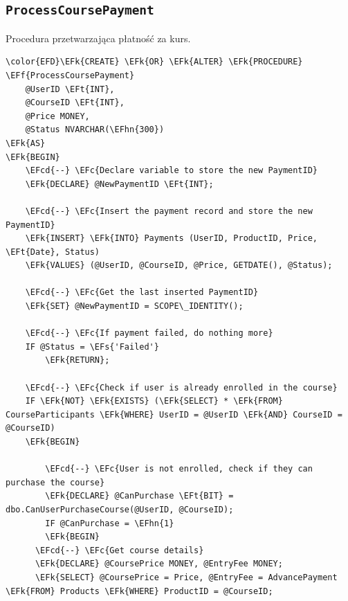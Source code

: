 \documentclass[11pt]{article}
\newcommand{\EFc}[1]{\textcolor{EFc}{\textit{#1}}} %
\newcommand{\EFcd}[1]{\textcolor{EFcd}{\textit{#1}}} %
\newcommand{\EFs}[1]{\textcolor{EFs}{#1}} %
\newcommand{\EFk}[1]{\textcolor{EFk}{\textbf{#1}}} %
\newcommand{\EFf}[1]{\textcolor{EFf}{#1}} %
\newcommand{\EFt}[1]{\textcolor{EFt}{\textbf{#1}}} %
\newcommand{\EFhn}[1]{\textcolor{EFhn}{#1}} %
\begin{document}
\subsection{\texttt{ProcessCoursePayment}}
\label{sec:org6cb37be}
Procedura przetwarzająca płatność za kurs.
\begin{Code}
\begin{Verbatim}
\color{EFD}\EFk{CREATE} \EFk{OR} \EFk{ALTER} \EFk{PROCEDURE} \EFf{ProcessCoursePayment}
    @UserID \EFt{INT},
    @CourseID \EFt{INT},
    @Price MONEY,
    @Status NVARCHAR(\EFhn{300})
\EFk{AS}
\EFk{BEGIN}
    \EFcd{--} \EFc{Declare variable to store the new PaymentID}
    \EFk{DECLARE} @NewPaymentID \EFt{INT};

    \EFcd{--} \EFc{Insert the payment record and store the new PaymentID}
    \EFk{INSERT} \EFk{INTO} Payments (UserID, ProductID, Price, \EFt{Date}, Status)
    \EFk{VALUES} (@UserID, @CourseID, @Price, GETDATE(), @Status);

    \EFcd{--} \EFc{Get the last inserted PaymentID}
    \EFk{SET} @NewPaymentID = SCOPE\_IDENTITY();

    \EFcd{--} \EFc{If payment failed, do nothing more}
    IF @Status = \EFs{'Failed'}
        \EFk{RETURN};

    \EFcd{--} \EFc{Check if user is already enrolled in the course}
    IF \EFk{NOT} \EFk{EXISTS} (\EFk{SELECT} * \EFk{FROM} CourseParticipants \EFk{WHERE} UserID = @UserID \EFk{AND} CourseID = @CourseID)
    \EFk{BEGIN}

        \EFcd{--} \EFc{User is not enrolled, check if they can purchase the course}
        \EFk{DECLARE} @CanPurchase \EFt{BIT} = dbo.CanUserPurchaseCourse(@UserID, @CourseID);
        IF @CanPurchase = \EFhn{1}
        \EFk{BEGIN}
      \EFcd{--} \EFc{Get course details}
      \EFk{DECLARE} @CoursePrice MONEY, @EntryFee MONEY;
      \EFk{SELECT} @CoursePrice = Price, @EntryFee = AdvancePayment \EFk{FROM} Products \EFk{WHERE} ProductID = @CourseID;


\end{Verbatim}
\end{Code}
\end{document}
